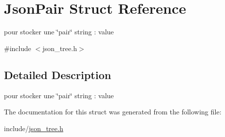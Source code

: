 \hypertarget{structJsonPair}{}\section{Json\+Pair Struct Reference}
\label{structJsonPair}


pour stocker une \char`\"{}pair\char`\"{} string \+: value  




{\ttfamily \#include $<$json\+\_\+tree.\+h$>$}



\subsection{Detailed Description}
pour stocker une \char`\"{}pair\char`\"{} string \+: value 

The documentation for this struct was generated from the following file\+:\begin{DoxyCompactItemize}
\item 
include/\hyperlink{json__tree_8h}{json\+\_\+tree.\+h}\end{DoxyCompactItemize}
